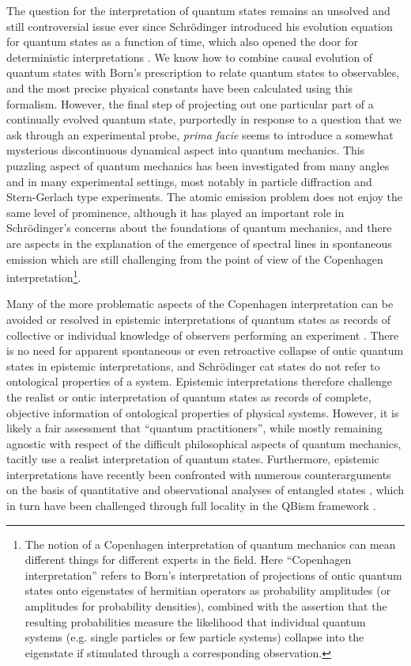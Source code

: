 \documentclass[final,3p,12pt]{elsarticle3}
\begin{document}
The question for the interpretation of quantum states remains an unsolved
and still controversial issue ever since Schr\"odinger introduced his 
evolution equation for quantum states as a function of time, which also 
opened the door for deterministic interpretations \cite{erwin}. We know 
how to combine causal evolution of quantum states with Born's prescription 
to relate quantum states to observables, and the most precise physical 
constants have been calculated using this formalism.
However, the final step of projecting out one particular part of a continually
evolved quantum state, purportedly in response to a question that we ask
through an experimental probe, {\it prima facie} seems to introduce a somewhat 
mysterious discontinuous dynamical aspect into quantum mechanics.
This puzzling aspect of quantum mechanics has been investigated from many
angles and in many experimental settings, most notably in particle diffraction
and Stern-Gerlach type experiments. The atomic emission problem does
not enjoy the same level of prominence, although it has played an important
role in Schr\"odinger's concerns about the foundations of quantum mechanics,
and there are aspects in the explanation of the emergence of spectral lines
in spontaneous emission which are still challenging from the point of view
of the Copenhagen interpretation\footnote{The notion of
a Copenhagen interpretation of quantum mechanics can mean different things
for different experts in the field. Here ``Copenhagen interpretation''
refers to Born's interpretation of projections of ontic quantum states
onto eigenstates of hermitian operators as probability amplitudes
(or amplitudes for probability densities), combined with the assertion
that the resulting probabilities measure the likelihood that individual
quantum systems (e.g. single particles or few particle systems)
collapse into the eigenstate if stimulated through a corresponding observation.}.

Many of the more problematic aspects of the Copenhagen interpretation can be 
avoided or resolved in epistemic interpretations of quantum states as records 
of collective or individual knowledge of observers performing an 
experiment \cite{fuchs,qb1,ferrero,spekkens}. There is no need for apparent
spontaneous or even retroactive collapse of ontic quantum states in epistemic 
interpretations, and Schr\"odinger cat states do not refer to ontological 
properties of a system. Epistemic interpretations therefore challenge the realist 
or ontic interpretation of quantum states as records of complete, objective 
information of ontological properties of physical systems. However, it is likely 
a fair assessment that ``quantum practitioners'', while mostly remaining agnostic 
with respect of the difficult philosophical aspects of quantum mechanics, tacitly 
use a realist interpretation of quantum states. Furthermore, epistemic 
interpretations have recently been confronted with numerous counterarguments on 
the basis of quantitative and observational analyses of entangled states
\cite{realpsia,realpsi0,realpsi1,realpsi2,realpsi3,realpsi4,realpsi5,realpsi6},
which in turn have been challenged through full locality 
in the QBism framework \cite{qb2}. 
\end{document}
